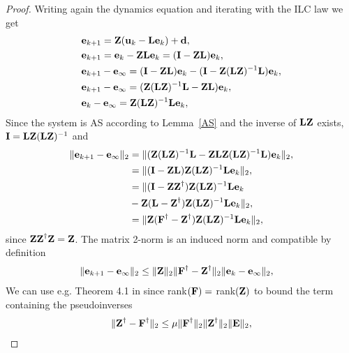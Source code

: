 %
\begin{proof}
Writing again the dynamics equation and iterating with the ILC law we get
%
\begin{align}
&\error_{k+1} = \latentMat(\sysInput_k - \lmatrix\error_k) + \linDist, \\
&\error_{k+1} = \error_{k} - \latentMat\lmatrix\error_k = (\vec{I} - \latentMat\lmatrix)\error_k, \\
&\error_{k+1} - \error_{\infty} = (\vec{I} - \latentMat\lmatrix)\error_k - (\vec{I} - \latentMat(\lmatrix\latentMat)^{-1}\lmatrix)\error_k, \\
&\error_{k+1} - \error_{\infty} = (\latentMat(\lmatrix\latentMat)^{-1}\lmatrix - \latentMat\lmatrix)\error_k, \\
&\error_{k} - \error_{\infty} = \latentMat(\lmatrix\latentMat)^{-1}\lmatrix\error_k,
\end{align}
%
Since the system is AS according to Lemma~\ref{AS} and the inverse of $\lmatrix\latentMat$ exists, $\vec{I} = \lmatrix\latentMat(\lmatrix\latentMat)^{-1}$ and
%
\begin{align}
\|\error_{k+1} - \error_{\infty}\|_2 &= \|(\latentMat(\lmatrix\latentMat)^{-1}\lmatrix - \latentMat\lmatrix\latentMat(\lmatrix\latentMat)^{-1}\lmatrix)\error_k\|_2, \\
&= \|(\vec{I} - \latentMat\lmatrix)\latentMat(\lmatrix\latentMat)^{-1}\lmatrix\error_k\|_2, \\
&= \|(\vec{I} - \latentMat\latentMat^{\dagger})\latentMat(\lmatrix\latentMat)^{-1}\lmatrix\error_k \\
& - \latentMat(\lmatrix -\latentMat^{\dagger})\latentMat(\lmatrix\latentMat)^{-1}\lmatrix\error_k\|_2, \\
&= \|\latentMat(\systemMat^{\dagger} - \latentMat^{\dagger})\latentMat(\lmatrix\latentMat)^{-1}\lmatrix\error_k\|_2,
\end{align}
%
since $\latentMat\latentMat^{\dagger}\latentMat = \latentMat$. The matrix 2-norm is an induced norm and compatible by definition
%
\begin{align}
\|\error_{k+1} - \error_{\infty}\|_2 &\leq \|\latentMat\|_2\|\systemMat^{\dagger} - \latentMat^{\dagger}\|_2\|\error_{k} - \error_{\infty}\|_2,
\end{align}
%
We can use e.g. Theorem 4.1 in \cite{Wedin73} since rank$(\systemMat) = $ rank$(\latentMat)$ to bound the term containing the pseudoinverses
%
\begin{align}
\|\latentMat^{\dagger} - \systemMat^{\dagger}\|_{2} \leq \mu \|\systemMat^{\dagger}\|_2 \|\latentMat^{\dagger}\|_2 \|\errorMat\|_2,

\end{align}
\end{proof}
